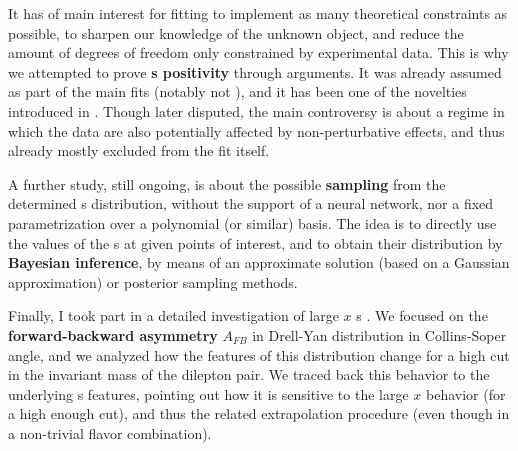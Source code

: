 It has of main interest for fitting to implement as many theoretical
constraints as possible, to sharpen our knowledge of the unknown object, and
reduce the amount of degrees of freedom only constrained by experimental data.
This is why we attempted to prove \textbf{\pdf{}s positivity}
 through \pqcd{} arguments.
It was already assumed as part of the main \pdf{} fits (notably not
), and it has been one of the novelties introduced in .
Though later disputed, the main controversy is about a regime in which the data
are also potentially affected by non-perturbative effects, and thus already
mostly excluded from the fit itself.

A further study, still ongoing, is about the possible \textbf{sampling} from
the determined \pdf{}s distribution, without the support of a neural network,
nor a fixed parametrization over a polynomial (or similar) basis.
The idea is to directly use the values of the \pdf{}s at given points of
interest, and to obtain their distribution by \textbf{Bayesian inference}, by
means of an approximate solution (based on a Gaussian approximation) or
posterior sampling methods.

Finally, I took part in a detailed investigation of large $x$ \pdf{}s
.
We focused on the \textbf{forward-backward asymmetry} $A_{FB}$ in Drell-Yan
distribution in Collins-Soper angle, and we analyzed how the features of this
distribution change for a high cut in the invariant mass of the dilepton pair.
We traced back this behavior to the underlying \pdf{}s features, pointing out
how it is sensitive to the large $x$ behavior (for a high enough cut), and thus
the related extrapolation procedure (even though in a non-trivial flavor
combination).
